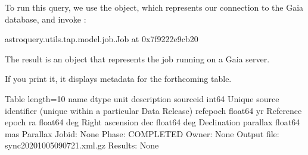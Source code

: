 \documentclass[letterpaper,10pt,english]{sphinxmanual}
\begin{document}
To run this query, we use the  object, which represents our connection to the Gaia database, and invoke :

\begin{sphinxVerbatim}[commandchars=\\\{\}]
  
\end{sphinxVerbatim}

\begin{sphinxVerbatim}[commandchars=\\\{\}]
\PYGZlt{}astroquery.utils.tap.model.job.Job at 0x7f9222e9cb20\PYGZgt{}
\end{sphinxVerbatim}

The result is an object that represents the job running on a Gaia server.

If you print it, it displays metadata for the forthcoming table.

\begin{sphinxVerbatim}[commandchars=\\\{\}]
\end{sphinxVerbatim}

\begin{sphinxVerbatim}[commandchars=\\\{\}]
\PYGZlt{}Table length=10\PYGZgt{}
   name    dtype  unit                            description                            
\PYGZhy{}\PYGZhy{}\PYGZhy{}\PYGZhy{}\PYGZhy{}\PYGZhy{}\PYGZhy{}\PYGZhy{}\PYGZhy{} \PYGZhy{}\PYGZhy{}\PYGZhy{}\PYGZhy{}\PYGZhy{}\PYGZhy{}\PYGZhy{} \PYGZhy{}\PYGZhy{}\PYGZhy{}\PYGZhy{} \PYGZhy{}\PYGZhy{}\PYGZhy{}\PYGZhy{}\PYGZhy{}\PYGZhy{}\PYGZhy{}\PYGZhy{}\PYGZhy{}\PYGZhy{}\PYGZhy{}\PYGZhy{}\PYGZhy{}\PYGZhy{}\PYGZhy{}\PYGZhy{}\PYGZhy{}\PYGZhy{}\PYGZhy{}\PYGZhy{}\PYGZhy{}\PYGZhy{}\PYGZhy{}\PYGZhy{}\PYGZhy{}\PYGZhy{}\PYGZhy{}\PYGZhy{}\PYGZhy{}\PYGZhy{}\PYGZhy{}\PYGZhy{}\PYGZhy{}\PYGZhy{}\PYGZhy{}\PYGZhy{}\PYGZhy{}\PYGZhy{}\PYGZhy{}\PYGZhy{}\PYGZhy{}\PYGZhy{}\PYGZhy{}\PYGZhy{}\PYGZhy{}\PYGZhy{}\PYGZhy{}\PYGZhy{}\PYGZhy{}\PYGZhy{}\PYGZhy{}\PYGZhy{}\PYGZhy{}\PYGZhy{}\PYGZhy{}\PYGZhy{}\PYGZhy{}\PYGZhy{}\PYGZhy{}\PYGZhy{}\PYGZhy{}\PYGZhy{}\PYGZhy{}\PYGZhy{}\PYGZhy{}\PYGZhy{}
source\PYGZus{}id   int64      Unique source identifier (unique within a particular Data Release)
ref\PYGZus{}epoch float64   yr                                                    Reference epoch
       ra float64  deg                                                    Right ascension
      dec float64  deg                                                        Declination
 parallax float64  mas                                                           Parallax
Jobid: None
Phase: COMPLETED
Owner: None
Output file: sync\PYGZus{}20201005090721.xml.gz
Results: None
\end{sphinxVerbatim}
\end{document}
